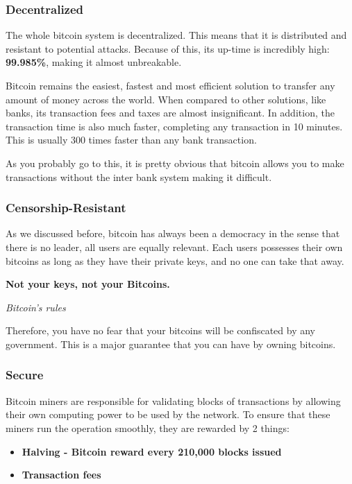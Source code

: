 \documentclass{article}
\newcommand\tab[1][1cm]{\hspace*{#1}}
\begin{document}
\subsubsection{Decentralized}

\tab The whole bitcoin system is decentralized. This means that it is distributed and resistant to potential attacks. Because of this, its up-time is incredibly high: \textbf{99.985\%}, making it almost unbreakable. 

Bitcoin remains the easiest, fastest and most efficient solution to transfer any amount of money across the world. When compared to other solutions, like banks, its transaction fees and taxes are almost insignificant. In addition, the transaction time is also much faster, completing any transaction in 10 minutes. This is usually 300 times faster than any bank transaction. 

As you probably go to this, it is pretty obvious that bitcoin allows you to make transactions without the inter bank system making it difficult.

\subsubsection{Censorship-Resistant}

\tab As we discussed before, bitcoin has always been a democracy in the sense that there is no leader, all users are equally relevant. Each users possesses their own bitcoins as long as they have their private keys, and no one can take that away. 

\renewcommand{\epigraphflush}{center}
\epigraph{\textbf{Not your keys, not your Bitcoins.}}{\textit{Bitcoin's rules}}

Therefore, you have no fear that your bitcoins will be confiscated by any government. This is a major guarantee that you can have by owning bitcoins.

\subsubsection{Secure}

\tab Bitcoin miners are responsible for validating blocks of transactions by allowing their own computing power to be used by the network. To ensure that these miners run the operation smoothly, they are rewarded by 2 things:

\begin{itemize}
    \item \textbf{Halving - Bitcoin reward every 210,000 blocks issued}
    \item \textbf{Transaction fees}
\end{itemize}
\end{document}
